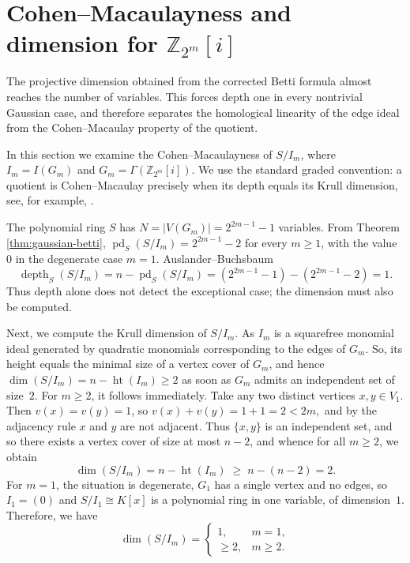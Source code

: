 \documentclass[12pt]{article}
\theoremstyle{definition}
\begin{document}
\section{Cohen--Macaulayness and dimension for \texorpdfstring{$\mathbb{Z}_{2^m}[i]$}{Z_2^m[i]}}\label{sec:gaussian-CM}
 The projective dimension obtained from the corrected Betti formula almost reaches the number of variables.  This forces depth one in every nontrivial Gaussian case, and therefore separates the homological linearity of the edge ideal from the Cohen--Macaulay property of the quotient.

\medskip

In this section we examine the Cohen--Macaulayness of $S/I_m$, where $I_m=I(G_m)$ and $G_m=\Gamma(\mathbb{Z}_{2^m}[i])$.  We use the standard graded convention: a quotient is Cohen--Macaulay precisely when its depth equals its Krull dimension, see, for example, \cite{BrunsHerzog1993,HerzogHibi2011}.

\medskip

The polynomial ring $S$ has
$ N=|V(G_m)|=2^{2m-1}-1 $
variables.  From Theorem \ref{thm:gaussian-betti},
$ \operatorname{pd}_S(S/I_m)=2^{2m-1}-2 $
for every $m\geq 1$, with the value $0$ in the degenerate case $m=1$.  Auslander--Buchsbaum \cite{AuslanderBuchsbaum1957}
\begin{equation}\label{eq 1}
	\operatorname{depth}_S(S/I_m)
	= n - \operatorname{pd}_S(S/I_m)
	= (2^{2m-1}-1) - (2^{2m-1}-2) = 1.
\end{equation}
Thus depth alone does not detect the exceptional case; the dimension must also be computed.

\medskip

Next, we compute the Krull dimension of $S/I_m$.  As $I_m$ is a squarefree	monomial ideal generated by quadratic monomials corresponding to the edges of	$G_m$. So, its height equals the minimal size of a vertex cover of $G_m$, and hence $\dim(S/I_m) = n - \operatorname{ht}(I_m)\geq 2$  as soon as $G_m$ admits an independent set of size~$2$. For $m\ge2$, it follows immediately.  Take any two distinct vertices	$x,y\in V_1$.  Then $v(x)=v(y)=1$, so $v(x) + v(y) = 1+1 = 2 < 2m,$ and by the adjacency rule $x$ and $y$ are not adjacent.  Thus $\{x,y\}$ is an
independent set, and so there exists a vertex cover of size at most $n-2$, and whence for all $m\geq 2$, we obtain
\[
\dim(S/I_m) = n - \operatorname{ht}(I_m) \;\ge\; n-(n-2) = 2.
\]
For $m=1$, the situation is degenerate, $G_1$ has a single vertex and no	edges, so $I_1=(0)$ and $S/I_1\cong K[x]$ is a polynomial ring in one	variable, of dimension~$1$. Therefore, we have
\[
\dim(S/I_m)=
\begin{cases}
	1, & m=1,\\[2pt]
	\ge 2, & m\ge2.
\end{cases}
\]
\end{document}
